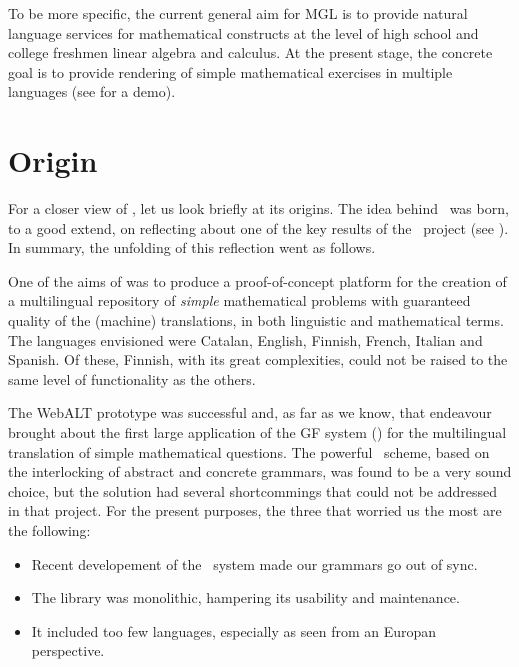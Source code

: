 \documentclass[adraft,copyright,creativecommons]{eptcs}
\begin{document}
To be more specific, the current general aim for MGL is to provide natural
language services for mathematical constructs at the level of high school
and college freshmen linear algebra and calculus.  At the present stage,
the concrete goal is to provide rendering of simple mathematical exercises
in multiple languages (see \cite{MathBar} for a demo).



\section{Origin}

For a closer view of \MGL, let us look briefly at its origins.  The
idea behind \MGL\ was born, to a good extend, on reflecting about one of
the key results of the \webalt\ project (see
\cite{Caprotti_multilingualdelivery, Caprotti06webalt!deliver, Nganga06}).  In
summary, the unfolding of this reflection went as follows.

One of the aims of \webalt{} was to produce a proof-of-concept
platform for the creation of a multilingual repository of \emph{simple}
mathematical problems with guaranteed quality of the (machine)
translations, in both linguistic and mathematical terms. The languages
envisioned were Catalan,
English,
Finnish,
French,
Italian and
Spanish.
Of these, Finnish, with its great complexities, could not be raised to
the same level of functionality as the others.

The WebALT prototype was successful and, as far as we know, that endeavour
brought about the first large application of the GF system (\cite{GF,Ranta11})
for the multilingual translation of simple mathematical questions.  The
powerful \GF\ scheme, based on the interlocking of abstract and
concrete grammars, was found to be a very sound choice, but the solution
had several shortcommings that could not be addressed in that project.
For the present purposes, the three that worried us the most are the
following:
\begin{itemize}
\item
Recent developement of the \GF\ system made our grammars go out of sync.
\item
The library was monolithic, hampering its usability and maintenance.
\item
It included too few languages, especially as seen from an Europan
perspective.
\end{itemize}
\end{document}
